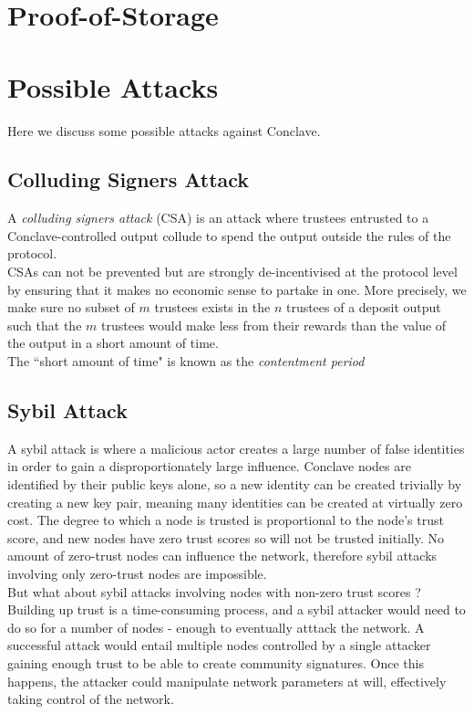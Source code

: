 \documentclass{article}
\begin{document}
\section{Proof-of-Storage}

\section{Possible Attacks}

Here we discuss some possible attacks against Conclave.

\subsection{Colluding Signers Attack}

A \textit{colluding signers attack} (CSA) is an attack where trustees entrusted to a Conclave-controlled output collude to spend the output outside the rules of the protocol. \\

CSAs can not be prevented but are strongly de-incentivised at the protocol level by ensuring that it makes no economic sense to partake in one. More precisely, we make sure no subset of $m$ trustees exists in the $n$ trustees of a deposit output such that the $m$ trustees would make less from their rewards than the value of the output in a short amount of time. \\

The ``short amount of time" is known as the \textit{contentment period}



\subsection{Sybil Attack}

A sybil attack is where a malicious actor creates a large number of false identities in order to gain a disproportionately large influence. Conclave nodes are identified by their public keys alone, so  a new identity can be created trivially by creating a new key pair, meaning many identities can be created at virtually zero cost. The degree to which a node is trusted is proportional to the node's trust score, and new nodes have zero trust scores so will not be trusted initially. No amount of zero-trust nodes can influence the network, therefore sybil attacks involving only zero-trust nodes are impossible. \\

But what about sybil attacks involving nodes with non-zero trust scores ? Building up trust is a time-consuming process, and a sybil attacker would need to do so for a number of nodes - enough to eventually atttack the network. A successful attack would entail multiple nodes controlled by a single attacker gaining enough trust to be able to create community signatures. Once this happens, the attacker could manipulate network parameters at will, effectively taking control of the network. \\
\end{document}
